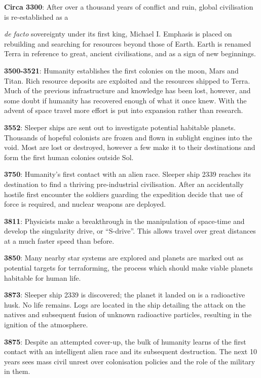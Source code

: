 \documentclass{scrbook}
\begin{document}
\textbf{Circa 3300}: After over a thousand years of conflict and ruin, global civilisation is re-established as a

\textit{de facto} sovereignty under its first king, Michael I. Emphasis is placed on rebuilding and searching for resources beyond those of Earth. Earth is renamed Terra in reference to great, ancient civilisations, and as a sign of new beginnings.

\textbf{3500-3521}: Humanity establishes the first colonies on the moon, Mars and Titan. Rich resource deposits are exploited and the resources shipped to Terra. Much of the previous infrastructure and knowledge has been lost, however, and some doubt if humanity has recovered enough of what it once knew. With the advent of space travel more effort is put into expansion rather than research.

\textbf{3552}: Sleeper ships are sent out to investigate potential habitable planets. Thousands of hopeful colonists are frozen and flown in sublight engines into the void. Most are lost or destroyed, however a few make it to their destinations and form the first human colonies outside Sol.

\textbf{3750}: Humanity's first contact with an alien race. Sleeper ship 2339 reaches its destination to find a thriving pre-industrial civilisation. After an accidentally hostile first encounter the soldiers guarding the expedition decide that use of force is required, and nuclear weapons are deployed.

\textbf{3811}: Physicists make a breakthrough in the manipulation of space-time and develop the singularity drive, or ``S-drive''. This allows travel over great distances at a much faster speed than before.

\textbf{3850}: Many nearby star systems are explored and planets are marked out as potential targets for terraforming, the process which should make viable planets habitable for human life.

\textbf{3873}: Sleeper ship 2339 is discovered; the planet it landed on is a radioactive husk. No life remains. Logs are located in the ship detailing the attack on the natives and subsequent fusion of unknown radioactive particles, resulting in the ignition of the atmosphere.

\textbf{3875}: Despite an attempted cover-up, the bulk of humanity learns of the first contact with an intelligent alien race and its subsequent destruction. The next 10 years sees mass civil unrest over colonisation policies and the role of the military in them.
\end{document}
